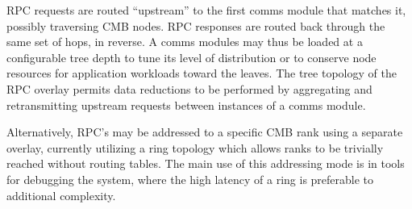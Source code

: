 RPC requests are routed ``upstream'' to the first comms module that matches
it, possibly traversing CMB nodes.  RPC responses are routed back through
the same set of hops, in reverse.  A comms modules may thus be loaded
at a configurable tree depth to tune its level of distribution
or to conserve node resources for application workloads toward the leaves.
The tree topology of the RPC overlay permits data reductions to be performed by
aggregating and retransmitting upstream requests between instances of
a comms module.

Alternatively, RPC's may be addressed to a specific CMB rank using a
separate overlay, currently utilizing a ring topology which allows
ranks to be trivially reached without routing tables.  The main use
of this addressing mode is in tools for debugging the system,
where the high latency of a ring is preferable to additional complexity.

%
